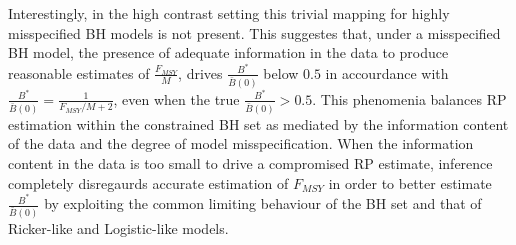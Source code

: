 \documentclass[12pt]{article}
\begin{document}
%
Interestingly, in the high contrast setting this trivial mapping for highly 
misspecified BH models is not present. This suggestes that, under a 
misspecified BH model, the presence of adequate information in the data to 
produce reasonable estimates of $\frac{F_{MSY}}{M}$, drives $\frac{B^*}{\bar B(0)}$ 
below $0.5$ in accourdance with $\frac{B^*}{\bar B(0)}=\frac{1}{F_{MSY}/M+2}$, 
even when the true $\frac{B^*}{\bar B(0)}>0.5$. 
This phenomenia balances RP estimation within the constrained BH set as 
mediated by the information content of the data and the degree of model 
misspecification. When the information content in the data is too small to 
drive a compromised RP estimate, inference completely disregaurds accurate 
estimation of $F_{MSY}$ in order to better estimate $\frac{B^*}{\bar B(0)}$ 
by exploiting the common limiting behaviour of the BH set and that of 
Ricker-like and Logistic-like models. 




%
%
%
%
%
\end{document}
